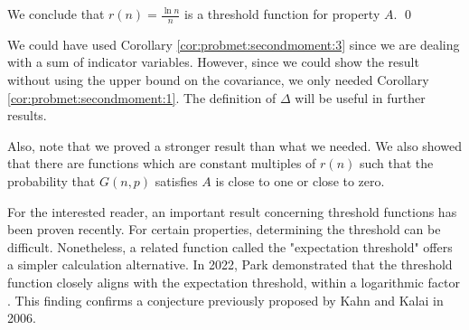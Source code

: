 We conclude that $r(n) = \frac{\ln n}{n}$ is a threshold function for property $A$. \qed \par
We could have used Corollary \ref{cor:probmet:secondmoment:3} since we are dealing with a sum of indicator variables. However, since we could show the result without using the upper bound on the covariance, we only needed Corollary \ref{cor:probmet:secondmoment:1}. The definition of $\Delta$ will be useful in further results. \par 
Also, note that we proved a stronger result than what we needed. We also showed that there are functions which are constant multiples of $r(n)$ such that the probability that $G(n, p)$ satisfies $A$ is close to one or close to zero. \par
For the interested reader, an important result concerning threshold functions has been proven recently. For certain properties, determining the threshold can be difficult. Nonetheless, a related function called the "expectation threshold" offers a simpler calculation alternative. In 2022, Park demonstrated that the threshold function closely aligns with the expectation threshold, within a logarithmic factor \cite{park2023proof}. This finding confirms a conjecture previously proposed by Kahn and Kalai in 2006.  \par

